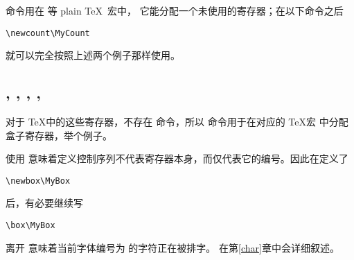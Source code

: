 \documentclass{book}
\begin{document}
 命令用在  等 plain \TeX\ 宏中，
它能分配一个未使用的寄存器；在以下命令之后
\begin{verbatim}
\newcount\MyCount
\end{verbatim}
 就可以完全按照上述两个例子那样使用。

\subsection{, , , , }

对于 \TeX 中的这些寄存器，不存在  命令，所以  命令用于在对应的 \TeX 宏  中分配盒子寄存器，举个例子。

使用  意味着定义控制序列不代表寄存器本身，而仅代表它的编号。因此在定义了
\begin{verbatim}
\newbox\MyBox
\end{verbatim}
后，有必要继续写
\begin{verbatim}
\box\MyBox
\end{verbatim} 
离开  意味着当前字体编号为 的字符正在被排字。
 在第\ref{char}章中会详细叙述。
\end{document}
